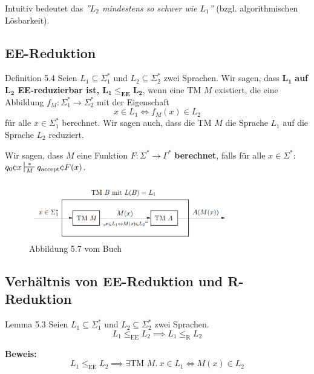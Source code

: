 \documentclass[a4paper, 11pt]{article}
\begin{document}
                Intuitiv bedeutet das \textit{''$L_2$ mindestens so schwer wie $L_1$''} (bzgl. algorithmischen Lösbarkeit).
            
            
            
                \subsection{EE-Reduktion}
                \begin{mainbox}{Definition 5.4}
                    Seien $L_1 \subseteq \Sigma_{1}^*$ und $L_2 \subseteq \Sigma_{2}^*$ zwei Sprachen. 
                    Wir sagen, dass $\mathbf{L_1}$ \textbf{auf $\mathbf{L_2}$ EE-reduzierbar ist, $\mathbf{L_1 \leq_{\textbf{EE}} L_2}$}, wenn eine TM $M$ existiert, 
                    die eine Abbildung $f_M: \Sigma_1^* \to \Sigma_2^*$ mit der Eigenschaft
                    $$x \in L_1 \iff f_M(x) \in L_2$$
                    für alle $x \in \Sigma_1^*$ berechnet. Wir sagen auch, dass die TM $M$ die Sprache $L_1$ auf die Sprache $L_2$ reduziert.
                \end{mainbox}
                
                \begin{subbox}{}
                    Wir sagen, dass $M$ eine Funktion $F: \Sigma^* \to \Gamma^*$ \textbf{berechnet}, 
                    falls für alle $x \in \Sigma^*$: $q_0\cent x \sststile{M}{*} q_{\text{accept}}\cent F(x)$.
                \end{subbox}
                \begin{figure}[htp]
                    \includegraphics[width=0.8\textwidth]{Images/Basic_EE-Reduktion.png}
                    \caption{Abbildung 5.7 vom Buch}
                \end{figure}
            
            
            
                \subsection{Verhältnis von EE-Reduktion und R-Reduktion}
                \begin{mainbox}{Lemma 5.3}
                    Seien $L_1 \subseteq \Sigma_{1}^*$ und $L_2 \subseteq \Sigma_{2}^*$ zwei Sprachen.
                    $$L_1 \leq_{\text{EE}} L_2 \implies L_1 \leq_{\text{R}} L_2$$
                \end{mainbox}
                \textbf{Beweis: }
                $$L_1 \leq_{\text{EE}} L_2 \implies \exists \text{TM } M. \ x \in L_1 \iff M(x) \in L_2$$
            
\end{document}
